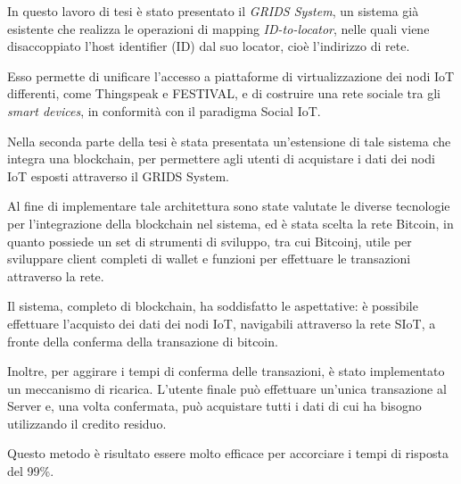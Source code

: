 In questo lavoro di tesi è stato presentato il \textit{GRIDS System}, un sistema già esistente che realizza le operazioni di mapping \textit{ID-to-locator}, nelle quali viene disaccoppiato l'host identifier (ID) dal suo locator, cioè l'indirizzo di rete.

Esso permette di unificare l'accesso a piattaforme di virtualizzazione dei nodi IoT differenti, come Thingspeak e FESTIVAL, e di costruire una rete sociale tra gli \textit{smart devices}, in conformità con il paradigma Social IoT.

Nella seconda parte della tesi è stata presentata un'estensione di tale sistema che integra una blockchain, per permettere agli utenti di acquistare i dati dei nodi IoT esposti attraverso il GRIDS System.

Al fine di implementare tale architettura sono state valutate le diverse tecnologie per l'integrazione della blockchain nel sistema, ed è stata scelta la rete Bitcoin, in quanto possiede un set di strumenti di sviluppo, tra cui Bitcoinj, utile per sviluppare client completi di wallet e funzioni per effettuare le transazioni attraverso la rete.

Il sistema, completo di blockchain, ha soddisfatto le aspettative: è possibile effettuare l'acquisto dei dati dei nodi IoT, navigabili attraverso la rete SIoT, a fronte della conferma della transazione di bitcoin. 

Inoltre, per aggirare i tempi di conferma delle transazioni, è stato implementato un meccanismo di ricarica. L'utente finale può effettuare un'unica transazione al Server e, una volta confermata, può acquistare tutti i dati di cui ha bisogno utilizzando il credito residuo. 

Questo metodo è risultato essere molto efficace per accorciare i tempi di risposta del 99\%.


